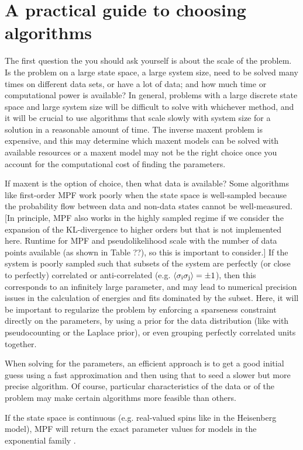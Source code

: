 \documentclass[aps,prl,twocolumn]{revtex4-1}
\begin{document}
\section{A practical guide to choosing algorithms}
The first question the you should ask yourself is about the scale of the problem. Is the problem on a large state space, a large system size, need to be solved many times on different data sets, or have a lot of data; and how much time or computational power is available? In general, problems with a large discrete state space and large system size will be difficult to solve with whichever method, and it will be crucial to use algorithms that scale slowly with system size for a solution in a reasonable amount of time. The inverse maxent problem is expensive, and this may determine which maxent models can be solved with available resources or a maxent model may not be the right choice once you account for the computational cost of finding the parameters.

If maxent is the option of choice, then what data is available? Some algorithms like first-order MPF work poorly when the state space is well-sampled because the probability flow between data and non-data states cannot be well-measured. [In principle, MPF also works in the highly sampled regime if we consider the expansion of the KL-divergence to higher orders but that is not implemented here. Runtime for MPF and pseudolikelihood scale with the number of data points available (as shown in Table ??), so this is important to consider.]
If the system is poorly sampled such that subsets of the system are perfectly (or close to perfectly) correlated or anti-correlated (e.g. $\left<\sigma_{\rm i}\sigma_{\rm j}\right>=\pm1$), then this corresponds to an infinitely large parameter, and may lead to numerical precision issues in the calculation of energies and fits dominated by the subset. Here, it will be important to regularize the problem by enforcing a sparseness constraint directly on the parameters, by using a prior for the data distribution (like with pseudocounting or the Laplace prior), or even grouping perfectly correlated units together.

When solving for the parameters, an efficient approach is to get a good initial guess using a fast approximation and then using that to seed a slower but more precise algorithm. Of course, particular characteristics of the data or of the problem may make certain algorithms more feasible than others.

If the state space is continuous (e.g. real-valued spins like in the Heisenberg model), MPF will return the exact parameter values for models in the exponential family \cite{SohlDickstein:2011im}.
\end{document}
